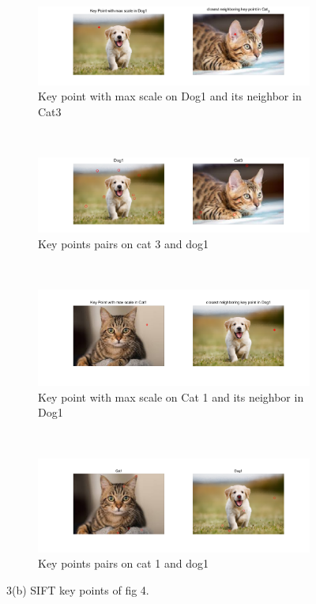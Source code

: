 \documentclass[12pt]{article}
\begin{document}
\begin{figure}[H]
		\hfill
		\begin{subfigure}{\textwidth}
			\centering
			\includegraphics[width=\textwidth]{i31.png}
			\caption{Key point with max scale on Dog1 and its neighbor in Cat3}
			\label{fig:cat3dog1}
		\end{subfigure}
		\\
		\hfill
		\begin{subfigure}{\textwidth}
			\centering
			\includegraphics[width=\textwidth]{i32.png}
			\caption{Key points pairs on cat 3 and dog1}
			\label{fig:cat3god3}
		\end{subfigure}
	\\
		\hfill
		\begin{subfigure}{\textwidth}
			\centering
			\includegraphics[width=\textwidth]{i41.png}
			\caption{Key point with max scale on Cat 1 and its neighbor in Dog1}
			\label{fig:cat1cmaxdog1}
		\end{subfigure}
		\\
		\hfill
		\begin{subfigure}{\textwidth}
			\centering
			\includegraphics[width=\textwidth]{i42.png}
			\caption{Key points pairs on cat 1 and dog1}
			\label{fig:cat1dog1}
		\end{subfigure}
				\caption{3(b) SIFT key points of fig 4.}
				\label{p1.2}
			\end{figure}
\end{document}
